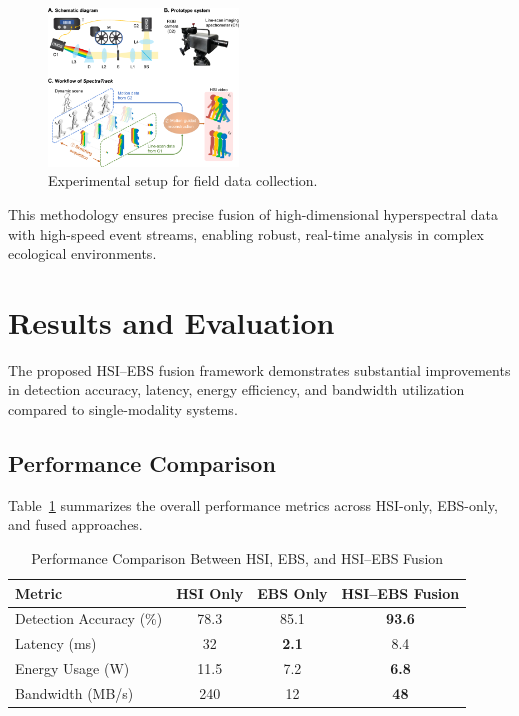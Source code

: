 \documentclass[conference]{IEEEtran}
\begin{document}
\begin{figure}[H]
    \centering
    \includegraphics[width=0.45\textwidth]{dataCollect.png}
    \caption{Experimental setup for field data collection.}
    \label{fig:setup}
\end{figure}

This methodology ensures precise fusion of high-dimensional hyperspectral data with high-speed event streams, enabling robust, real-time analysis in complex ecological environments.


\section{Results and Evaluation}

The proposed HSI–EBS fusion framework demonstrates substantial improvements in detection accuracy, latency, energy efficiency, and bandwidth utilization compared to single-modality systems.

\subsection{Performance Comparison}

Table~\ref{tab:performance_comparison} summarizes the overall performance metrics across HSI-only, EBS-only, and fused approaches.

\begin{table}[H]
\centering
\caption{Performance Comparison Between HSI, EBS, and HSI–EBS Fusion}
\label{tab:performance_comparison}
\begin{tabular}{lccc}
\toprule
Metric & HSI Only & EBS Only & HSI–EBS Fusion \\
\midrule
Detection Accuracy (\%) & 78.3 & 85.1 & \textbf{93.6} \\
Latency (ms) & 32 & \textbf{2.1} & 8.4 \\
Energy Usage (W) & 11.5 & 7.2 & \textbf{6.8} \\
Bandwidth (MB/s) & 240 & 12 & \textbf{48} \\
\bottomrule
\end{tabular}
\end{table}
\end{document}
